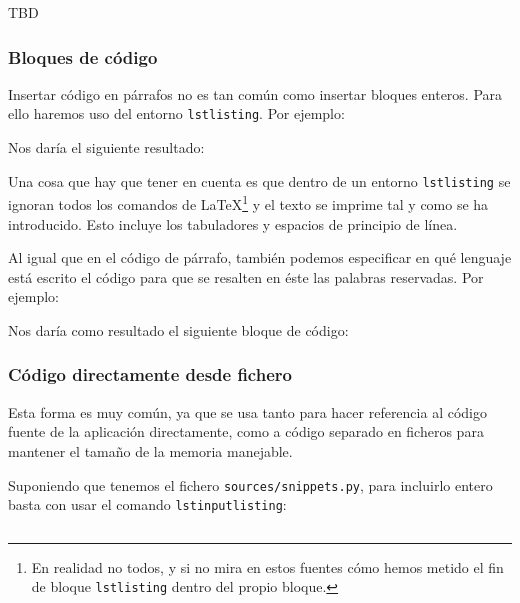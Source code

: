 \documentclass[%
    school=etsisi,%
    type=pfg,%
    degree=61CD,%
]{upm-report}
\begin{document}
TBD

\subsubsection{Bloques de código}

Insertar código en párrafos no es tan común como insertar bloques enteros. Para ello haremos uso del entorno \texttt{lstlisting}. Por ejemplo:



Nos daría el siguiente resultado:



Una cosa que hay que tener en cuenta es que dentro de un entorno \texttt{lstlisting} se ignoran todos los comandos de \LaTeX\space\footnote{En realidad no todos, y si no mira en estos fuentes cómo hemos metido el fin de bloque \texttt{lstlisting} dentro del propio bloque.} y el texto se imprime tal y como se ha introducido. Esto incluye los tabuladores y espacios de principio de línea.

Al igual que en el código de párrafo, también podemos especificar en qué lenguaje está escrito el código para que se resalten en éste las palabras reservadas. Por ejemplo:



Nos daría como resultado el siguiente bloque de código:
 


\subsubsection{Código directamente desde fichero}

Esta forma es muy común, ya que se usa tanto para hacer referencia al código fuente de la aplicación directamente, como a código separado en ficheros para mantener el tamaño de la memoria manejable.

Suponiendo que tenemos el fichero \texttt{sources/snippets.py}, para incluirlo entero basta con usar el comando \texttt{lstinputlisting}:

\begin{lstlisting}[language=TeX]

\end{lstlisting}
\end{document}
